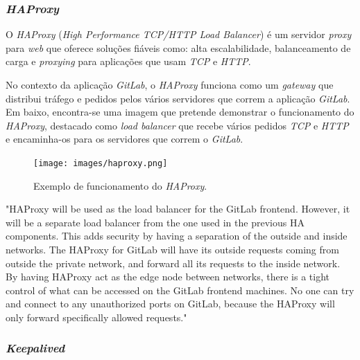 \documentclass[12pt,a4paper]{article}
\begin{document}
\subsubsection{\emph{HAProxy}}


O \emph{HAProxy} (\emph{High Performance TCP/HTTP Load Balancer}) é um servidor \emph{proxy} para \emph{web} que oferece soluções fiáveis como: alta escalabilidade, balanceamento de carga e \emph{proxying} para aplicações que usam \emph{TCP} e \emph{HTTP}.

No contexto da aplicação \emph{GitLab}, o \emph{HAProxy} funciona como um \emph{gateway} que distribui tráfego e pedidos pelos vários servidores que correm a aplicação \emph{GitLab}. Em baixo, encontra-se uma imagem que pretende demonstrar o funcionamento do \emph{HAProxy}, destacado como \emph{load balancer} que recebe vários pedidos \emph{TCP} e \emph{HTTP} e encaminha-os para os servidores que correm o \emph{GitLab}.

\begin{figure}[H]
  \centering
  \texttt{[image: images/haproxy.png]}
  \caption{Exemplo de funcionamento do \emph{HAProxy}.}
\end{figure}

\newpage
"HAProxy will be used as the load balancer for the GitLab frontend. However, it will be a separate load balancer from the one used in the previous HA components. This adds security by having a separation of the outside and inside networks. The HAProxy for GitLab will have its outside requests coming from outside the private network, and forward all its requests to the inside network. By having HAProxy act as the edge node between networks, there is a tight control of what can be accessed on the GitLab frontend machines. No one can try and connect to any unauthorized ports on GitLab, because the HAProxy will only forward specifically allowed requests."


\subsubsection{\emph{Keepalived}}
\end{document}
